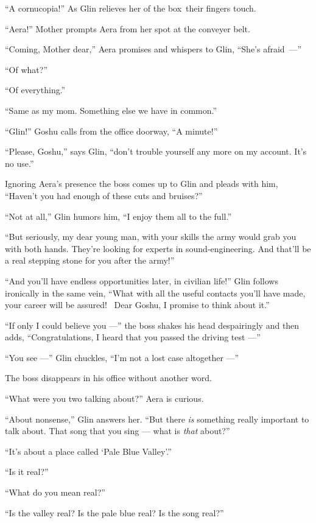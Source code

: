 \documentclass[twoside,11pt]{book}
\begin{document}
``A cornucopia!'' As Glin relieves her of the box~their fingers touch.

``Aera!'' Mother prompts Aera from her spot at the conveyer belt.

``Coming, Mother dear,'' Aera promises and whispers to Glin, ``She's \hbox{afraid ---''}

``Of what?''

``Of everything.''

``Same as my mom. Something else we have in common.''

``Glin!'' Goshu calls from the office doorway, ``A minute!''

``Please, Goshu,'' says Glin, ``don't trouble yourself any more on my account.
It's no use.''

Ignoring Aera's presence the boss comes up to Glin and pleads with him, ``Haven't you had enough of these
cuts and bruises?''

``Not at all,'' Glin humors him, ``I enjoy them all to the full.''

``But seriously, my dear young man, with your skills the army would grab you with both hands. They're
looking for experts in sound-engineering. And that'll be a real stepping stone for you after the army!''

``And you'll have endless opportunities later, in civilian life!''  Glin follows
ironically{ }in the same vein, ``What with all the useful contacts you'll have made, your
career will be assured! ~Dear Goshu, I promise to think about it.''

``If only I could believe you ---'' the boss shakes his head despairingly and
then adds, ``Congratulations, I heard that you passed the driving test ---''

``You see ---'' Glin chuckles, ``I'm not a lost case altogether ---''

The boss disappears in his office without another word.

{ }``What were you two talking about?'' Aera is curious.

``About nonsense,'' Glin answers her. ``But there \textit{is} something really
important to talk about. That song that you sing --- what is \textit{that} about?''

``It's about a place called `Pale Blue Valley'.''

``Is it real?''

``What do you mean real?''

``Is the valley real? Is the pale blue real? Is the song real?''
\end{document}

